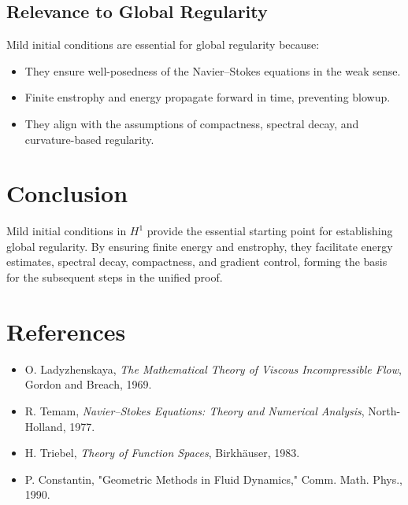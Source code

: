 \subsection{Relevance to Global Regularity}
Mild initial conditions are essential for global regularity because:
\begin{itemize}
    \item They ensure well-posedness of the Navier--Stokes equations in the weak sense.
    \item Finite enstrophy and energy propagate forward in time, preventing blowup.
    \item They align with the assumptions of compactness, spectral decay, and curvature-based regularity.
\end{itemize}

\section*{Conclusion}
Mild initial conditions in $H^1$ provide the essential starting point for establishing global regularity. By ensuring finite energy and enstrophy, they facilitate energy estimates, spectral decay, compactness, and gradient control, forming the basis for the subsequent steps in the unified proof.

\section*{References}
\begin{itemize}
    \item O. Ladyzhenskaya, \emph{The Mathematical Theory of Viscous Incompressible Flow}, Gordon and Breach, 1969.
    \item R. Temam, \emph{Navier--Stokes Equations: Theory and Numerical Analysis}, North-Holland, 1977.
    \item H. Triebel, \emph{Theory of Function Spaces}, Birkh\"auser, 1983.
    \item P. Constantin, "Geometric Methods in Fluid Dynamics," Comm. Math. Phys., 1990.
\end{itemize}

